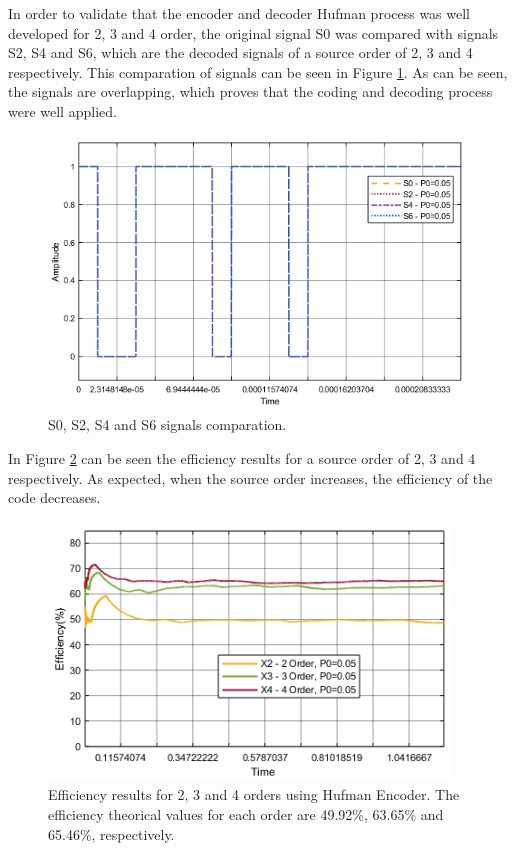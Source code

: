 \begin{refsection}
In order to validate that the encoder and decoder Hufman process was well developed for 2, 3 and 4 order, the original signal S0 was compared with signals S2, S4 and S6, which are the decoded signals of a source order of 2, 3 and 4 respectively.
This comparation of signals can be seen in Figure \ref{f:S0S2S4S6}. As can be seen, the signals are overlapping, which proves that the coding and decoding process were well applied.

\begin{figure}[!h]
\centering
\includegraphics[width=5in]{./sdf/eit_45550_estimator_source_code_efficiency/figures/S0S2S4S6.png}
\caption[S0, S2, S4 and S6 signals comparation]{S0, S2, S4 and S6 signals comparation.}
\label{f:S0S2S4S6}
\end{figure}

In Figure \ref{f:efficiencygraph} can be seen the efficiency results for a source order of 2, 3 and 4 respectively. As expected, when the source order increases, the efficiency of the code decreases.

\begin{figure}[!h]
\centering
\includegraphics[width=4.2in]{./sdf/eit_45550_estimator_source_code_efficiency/figures/efficiencygraph.png}
\caption[Efficiency results for 2, 3 and 4 orders using Hufman Encoder.]{Efficiency results for 2, 3 and 4 orders using Hufman Encoder. The efficiency theorical values for each order are 49.92\%, 63.65\% and 65.46\%, respectively.}
\label{f:efficiencygraph}
\end{figure}


\end{refsection}

